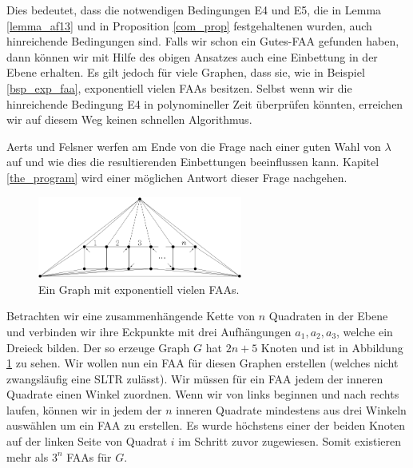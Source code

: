 \begin{remark}
Dies bedeutet, dass die notwendigen Bedingungen E4 und E5, die in Lemma \ref{lemma_af13} und in Proposition \ref{com_prop} festgehaltenen wurden, auch hinreichende Bedingungen sind. Falls wir schon ein Gutes-FAA gefunden haben, dann können wir mit Hilfe des obigen Ansatzes auch eine Einbettung in der Ebene erhalten. Es gilt jedoch für viele Graphen, dass sie, wie in Beispiel \ref{bsp_exp_faa}, exponentiell vielen FAAs besitzen. Selbst wenn wir die hinreichende Bedingung E4 in polynomineller Zeit überprüfen könnten, erreichen wir auf diesem Weg keinen schnellen Algorithmus.
\end{remark}

Aerts und Felsner werfen am Ende von \cite{af13} die Frage nach einer guten Wahl von $\lambda$ auf und wie dies die resultierenden Einbettungen beeinflussen kann. Kapitel \ref{the_program} wird einer möglichen Antwort dieser Frage nachgehen.

\begin{figure}
	\centering
  \includegraphics[width=0.6\textwidth]{exp_faa.png}
  \caption{Ein Graph mit exponentiell vielen FAAs.}
  \label{exp_faa}
\end{figure}

\begin{example}\label{bsp_exp_faa}
Betrachten wir eine zusammenhängende Kette von $n$ Quadraten in der Ebene und verbinden wir ihre Eckpunkte mit drei Aufhängungen $a_1,a_2,a_3$, welche ein Dreieck bilden. Der so erzeuge Graph $G$ hat $2n+5$ Knoten und ist in Abbildung \ref{exp_faa} zu sehen. Wir wollen nun ein FAA für diesen Graphen erstellen (welches nicht zwangsläufig eine SLTR zulässt). Wir müssen für ein FAA jedem der inneren Quadrate einen Winkel zuordnen. Wenn wir von links beginnen und nach rechts laufen, können wir in jedem der $n$ inneren Quadrate mindestens aus drei Winkeln auswählen um ein FAA zu erstellen. Es wurde höchstens einer der beiden Knoten auf der linken Seite von Quadrat $i$ im Schritt zuvor zugewiesen. Somit existieren mehr als $3^n$ FAAs für $G.$
\end{example}
